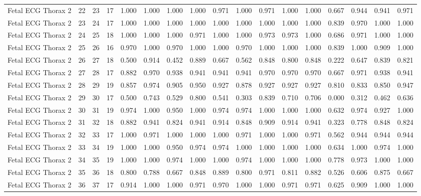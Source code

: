 \begin{longtable}{lllllllllllllllll}
Fetal ECG Thorax 2 & 22 & 23 & 17 & 1.000 & 1.000 & 1.000 & 1.000 & 0.971 & 1.000 & 0.971 & 1.000 & 1.000 & 0.667 & 0.944 & 0.941 & 0.971 \\
Fetal ECG Thorax 2 & 23 & 24 & 17 & 1.000 & 1.000 & 1.000 & 1.000 & 1.000 & 1.000 & 1.000 & 1.000 & 1.000 & 0.839 & 0.970 & 1.000 & 1.000 \\
Fetal ECG Thorax 2 & 24 & 25 & 18 & 1.000 & 1.000 & 1.000 & 0.971 & 1.000 & 1.000 & 0.973 & 0.973 & 1.000 & 0.686 & 0.971 & 1.000 & 1.000 \\
Fetal ECG Thorax 2 & 25 & 26 & 16 & 0.970 & 1.000 & 0.970 & 1.000 & 1.000 & 0.970 & 1.000 & 1.000 & 1.000 & 0.839 & 1.000 & 0.909 & 1.000 \\
Fetal ECG Thorax 2 & 26 & 27 & 18 & 0.500 & 0.914 & 0.452 & 0.889 & 0.667 & 0.562 & 0.848 & 0.800 & 0.848 & 0.222 & 0.647 & 0.839 & 0.821 \\
Fetal ECG Thorax 2 & 27 & 28 & 17 & 0.882 & 0.970 & 0.938 & 0.941 & 0.941 & 0.941 & 0.970 & 0.970 & 0.970 & 0.667 & 0.971 & 0.938 & 0.941 \\
Fetal ECG Thorax 2 & 28 & 29 & 19 & 0.857 & 0.974 & 0.905 & 0.950 & 0.927 & 0.878 & 0.927 & 0.927 & 0.927 & 0.810 & 0.833 & 0.850 & 0.947 \\
Fetal ECG Thorax 2 & 29 & 30 & 17 & 0.500 & 0.743 & 0.529 & 0.800 & 0.541 & 0.303 & 0.839 & 0.710 & 0.706 & 0.000 & 0.312 & 0.462 & 0.636 \\
Fetal ECG Thorax 2 & 30 & 31 & 19 & 0.974 & 1.000 & 0.950 & 1.000 & 0.974 & 0.974 & 1.000 & 1.000 & 1.000 & 0.632 & 0.974 & 0.927 & 1.000 \\
Fetal ECG Thorax 2 & 31 & 32 & 18 & 0.882 & 0.941 & 0.824 & 0.941 & 0.914 & 0.848 & 0.909 & 0.914 & 0.941 & 0.323 & 0.778 & 0.848 & 0.824 \\
Fetal ECG Thorax 2 & 32 & 33 & 17 & 1.000 & 0.971 & 1.000 & 1.000 & 1.000 & 0.971 & 1.000 & 1.000 & 0.971 & 0.562 & 0.944 & 0.944 & 0.944 \\
Fetal ECG Thorax 2 & 33 & 34 & 19 & 1.000 & 1.000 & 0.950 & 0.974 & 0.974 & 1.000 & 1.000 & 1.000 & 1.000 & 0.634 & 1.000 & 0.974 & 1.000 \\
Fetal ECG Thorax 2 & 34 & 35 & 19 & 1.000 & 1.000 & 0.974 & 1.000 & 1.000 & 0.974 & 1.000 & 1.000 & 1.000 & 0.778 & 0.973 & 1.000 & 1.000 \\
Fetal ECG Thorax 2 & 35 & 36 & 18 & 0.800 & 0.788 & 0.667 & 0.848 & 0.889 & 0.800 & 0.971 & 0.811 & 0.882 & 0.526 & 0.606 & 0.875 & 0.667 \\
Fetal ECG Thorax 2 & 36 & 37 & 17 & 0.914 & 1.000 & 1.000 & 0.971 & 0.970 & 1.000 & 1.000 & 0.971 & 0.971 & 0.625 & 0.909 & 1.000 & 1.000 \\

\end{longtable}
